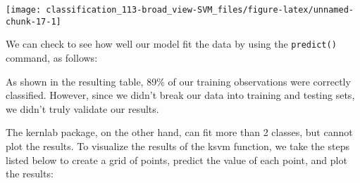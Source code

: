 \documentclass[]{book}
\newenvironment{Shaded}{\begin{snugshade}}{\end{snugshade}}
\newcommand{\CommentTok}[1]{\textcolor[rgb]{0.56,0.35,0.01}{\textit{#1}}}
\newcommand{\DataTypeTok}[1]{\textcolor[rgb]{0.13,0.29,0.53}{#1}}
\newcommand{\KeywordTok}[1]{\textcolor[rgb]{0.13,0.29,0.53}{\textbf{#1}}}
\newcommand{\NormalTok}[1]{#1}
\newcommand{\OperatorTok}[1]{\textcolor[rgb]{0.81,0.36,0.00}{\textbf{#1}}}
\newcommand{\StringTok}[1]{\textcolor[rgb]{0.31,0.60,0.02}{#1}}
\begin{document}
\begin{center}\texttt{[image: classification\_113-broad\_view-SVM\_files/figure-latex/unnamed-chunk-17-1]} \end{center}

We can check to see how well our model fit the data by using the \texttt{predict()} command, as follows:

\begin{Shaded}
\end{Shaded}

As shown in the resulting table, 89\% of our training observations were correctly classified. However, since we didn't break our data into training and testing sets, we didn't truly validate our results.

The kernlab package, on the other hand, can fit more than 2 classes, but cannot plot the results. To visualize the results of the ksvm function, we take the steps listed below to create a grid of points, predict the value of each point, and plot the results:
\end{document}
